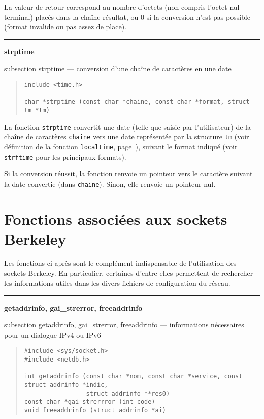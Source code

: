 \documentclass [twoside] {report}
\newcommand {\primitive} [1]
    {
	\phantomsection
	{\large \bf #1}
	\addcontentsline {toc} {subsection} {#1}
    }
\newcommand {\separation}
    {
	\vspace {5mm}
	\nopagebreak
	\hrule
    }
\begin{document}
La valeur de retour correspond au nombre d'octets (non compris l'octet
nul terminal) placés dans la chaîne résultat, ou 0 si la conversion
n'est pas possible (format invalide ou pas assez de place).


\separation
\primitive {strptime} --- conversion d'une chaîne de caractères en une date

\begin {quote}
\begin {verbatim}
include <time.h>

char *strptime (const char *chaine, const char *format, struct tm *tm)
\end{verbatim}
\end {quote}

La fonction \texttt {strptime} convertit une date (telle que saisie par
l'utilisateur) de la chaîne de caractères \texttt {chaine} vers une
date représentée par la structure \texttt {tm} (voir définition de
la fonction \texttt {localtime}, page~\pageref {struct-tm}), suivant le
format indiqué (voir \texttt {strftime} pour les principaux formats).

Si la conversion réussit, la fonction renvoie un pointeur vers le
caractère suivant la date convertie (dans \texttt {chaine}). Sinon,
elle renvoie un pointeur nul.


\section {Fonctions associées aux sockets Berkeley}

Les fonctions ci-après sont le complément indispensable de l'utilisation
des sockets Berkeley.  En particulier, certaines d'entre elles
permettent de rechercher les informations utiles dans les divers
fichiers de configuration du réseau.


\separation
\primitive {getaddrinfo, gai\_strerror, freeaddrinfo} --- informations
    nécessaires pour un dialogue IPv4 ou IPv6

\begin {quote}
\begin {verbatim}
#include <sys/socket.h>
#include <netdb.h>

int getaddrinfo (const char *nom, const char *service, const struct addrinfo *indic,
                 struct addrinfo **res0)
const char *gai_strerrror (int code)
void freeaddrinfo (struct addrinfo *ai)
\end{verbatim}
\end {quote}
\end{document}

